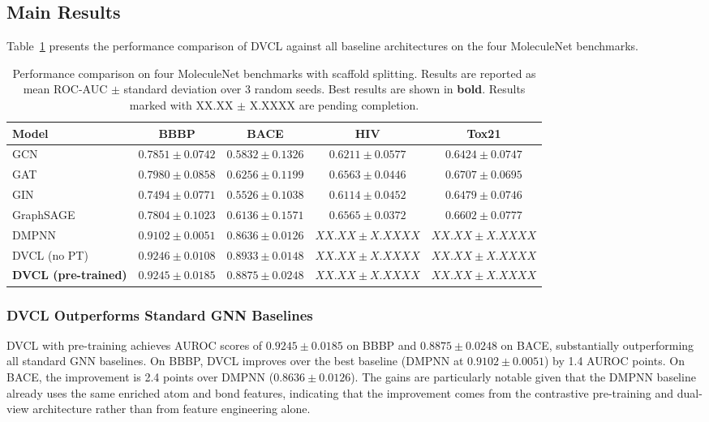 \documentclass[a4paper,fleqn]{cas-sc}
\begin{document}
\subsection{Main Results}\label{sec:results}

Table~\ref{tab:main_results} presents the performance comparison of DVCL against all baseline architectures on the four MoleculeNet benchmarks.

\begin{table}[!t]
\centering
\caption{Performance comparison on four MoleculeNet benchmarks with scaffold splitting. Results are reported as mean ROC-AUC $\pm$ standard deviation over 3 random seeds. Best results are shown in \textbf{bold}. Results marked with XX.XX $\pm$ X.XXXX are pending completion.}
\label{tab:main_results}
\begin{tabular}{l c c c c}
\toprule
\textbf{Model} & \textbf{BBBP} & \textbf{BACE} & \textbf{HIV} & \textbf{Tox21} \\
\midrule
GCN          & $0.7851 \pm 0.0742$ & $0.5832 \pm 0.1326$ & $0.6211 \pm 0.0577$ & $0.6424 \pm 0.0747$ \\
GAT          & $0.7980 \pm 0.0858$ & $0.6256 \pm 0.1199$ & $0.6563 \pm 0.0446$ & $0.6707 \pm 0.0695$ \\
GIN          & $0.7494 \pm 0.0771$ & $0.5526 \pm 0.1038$ & $0.6114 \pm 0.0452$ & $0.6479 \pm 0.0746$ \\
GraphSAGE    & $0.7804 \pm 0.1023$ & $0.6136 \pm 0.1571$ & $0.6565 \pm 0.0372$ & $0.6602 \pm 0.0777$ \\
DMPNN        & $0.9102 \pm 0.0051$ & $0.8636 \pm 0.0126$ & $XX.XX \pm X.XXXX$ & $XX.XX \pm X.XXXX$ \\
\midrule
DVCL (no PT) & $0.9246 \pm 0.0108$ & $0.8933 \pm 0.0148$ & $XX.XX \pm X.XXXX$ & $XX.XX \pm X.XXXX$ \\
\textbf{DVCL (pre-trained)} & $\mathbf{0.9245 \pm 0.0185}$ & $\mathbf{0.8875 \pm 0.0248}$ & $XX.XX \pm X.XXXX$ & $XX.XX \pm X.XXXX$ \\
\bottomrule
\end{tabular}
\end{table}

\subsubsection{DVCL Outperforms Standard GNN Baselines}

DVCL with pre-training achieves AUROC scores of $0.9245 \pm 0.0185$ on BBBP and $0.8875 \pm 0.0248$ on BACE, substantially outperforming all standard GNN baselines. On BBBP, DVCL improves over the best baseline (DMPNN at $0.9102 \pm 0.0051$) by 1.4 AUROC points. On BACE, the improvement is 2.4 points over DMPNN ($0.8636 \pm 0.0126$). The gains are particularly notable given that the DMPNN baseline already uses the same enriched atom and bond features, indicating that the improvement comes from the contrastive pre-training and dual-view architecture rather than from feature engineering alone.
\end{document}
